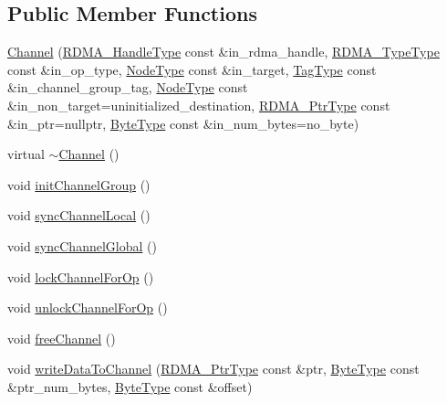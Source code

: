\subsection*{Public Member Functions}
\begin{DoxyCompactItemize}
\item 
\hyperlink{structvt_1_1rdma_1_1_channel_ae15a5cd0e393f64192675d5a33796523}{Channel} (\hyperlink{namespacevt_a10442579ec4e7ebef223818e64bcf908}{R\+D\+M\+A\+\_\+\+Handle\+Type} const \&in\+\_\+rdma\+\_\+handle, \hyperlink{namespacevt_1_1rdma_ac848e1d9da43db6294bd06f83e5d3946}{R\+D\+M\+A\+\_\+\+Type\+Type} const \&in\+\_\+op\+\_\+type, \hyperlink{namespacevt_a866da9d0efc19c0a1ce79e9e492f47e2}{Node\+Type} const \&in\+\_\+target, \hyperlink{namespacevt_a84ab281dae04a52a4b243d6bf62d0e52}{Tag\+Type} const \&in\+\_\+channel\+\_\+group\+\_\+tag, \hyperlink{namespacevt_a866da9d0efc19c0a1ce79e9e492f47e2}{Node\+Type} const \&in\+\_\+non\+\_\+target=uninitialized\+\_\+destination, \hyperlink{namespacevt_aab05b4a584f7ee835a6d0f66915cf59b}{R\+D\+M\+A\+\_\+\+Ptr\+Type} const \&in\+\_\+ptr=nullptr, \hyperlink{namespacevt_aab8d55968084610ce3b17057981e9300}{Byte\+Type} const \&in\+\_\+num\+\_\+bytes=no\+\_\+byte)
\item 
virtual \hyperlink{structvt_1_1rdma_1_1_channel_a4e32f293df8c7d988a080065647c4253}{$\sim$\+Channel} ()
\item 
void \hyperlink{structvt_1_1rdma_1_1_channel_a8b95715326b4f434ebe53c5577403b3b}{init\+Channel\+Group} ()
\item 
void \hyperlink{structvt_1_1rdma_1_1_channel_a5ce567dd26c64a6d8a8ea9a9b3d525f8}{sync\+Channel\+Local} ()
\item 
void \hyperlink{structvt_1_1rdma_1_1_channel_a858e3b9d213cd2fb98e021c5c8b58e96}{sync\+Channel\+Global} ()
\item 
void \hyperlink{structvt_1_1rdma_1_1_channel_ac9dca439a032110524cf303925bace58}{lock\+Channel\+For\+Op} ()
\item 
void \hyperlink{structvt_1_1rdma_1_1_channel_adb5c10cdeb4e72e54433622091b543c6}{unlock\+Channel\+For\+Op} ()
\item 
void \hyperlink{structvt_1_1rdma_1_1_channel_a0e68ef1830979531a430f2a9b0206afb}{free\+Channel} ()
\item 
void \hyperlink{structvt_1_1rdma_1_1_channel_af7d6fb54933f6ad3d12cb600ababfa18}{write\+Data\+To\+Channel} (\hyperlink{namespacevt_aab05b4a584f7ee835a6d0f66915cf59b}{R\+D\+M\+A\+\_\+\+Ptr\+Type} const \&ptr, \hyperlink{namespacevt_aab8d55968084610ce3b17057981e9300}{Byte\+Type} const \&ptr\+\_\+num\+\_\+bytes, \hyperlink{namespacevt_aab8d55968084610ce3b17057981e9300}{Byte\+Type} const \&offset)

\end{DoxyCompactItemize}
